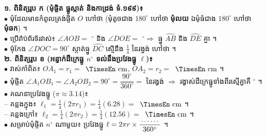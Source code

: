 \documentclass[a4paper,10pt]{article}
\newcommand{\en}[1]{{\TimesEn #1}}
\newcommand{\unit}[1]{\,\text{\en{#1}}}
\newcommand{\ang}[1]{\ensuremath{\angle #1}}
\newcommand{\arc}[1]{\ensuremath{\widehat{#1}}}
\newcommand{\dotline}[1]{\makebox[#1]{\dotfill}}
\begin{document}
\begin{tcolorbox}[enhanced, sharp corners, colback=white, colframe=black, boxrule=0.85pt, top=4pt, bottom=4pt, left=6pt, right=6pt]
\begin{minipage}[c]{9.0cm}
  \end{minipage}\hfill
  \begin{minipage}[c]{9.2cm}
    \textbf{១. ពិនិត្យរូប ក (មុំផ្ចិត ធ្នូស្កាត់ និងកាដ្រង់ ទំ.១៩៩)៖}\\[1.5pt]
    $\bullet$ មុំដែលមានកំពូលត្រង់ផ្ចិត $O$ ហៅថា \dotline{1.9cm} (មុំតូចជាង $180^\circ$ ហៅថា \textbf{មុំលយ} ឯមុំធំជាង $180^\circ$ ហៅថា \textbf{មុំឆក}) ។\\[1.5pt]
    $\bullet$ ប្រើរ៉ាប់ព័រទ័រវាស់៖ $\ang{AOB} =$ \dotline{1.0cm}$^\circ$ និង $\ang{DOE} =$ \dotline{1.0cm}$^\circ \Rightarrow$ ធ្នូ $\arc{AB}$ និង $\arc{DE}$ \dotline{1.7cm} គ្នា ។\\[1.5pt]
    $\bullet$ មុំកែង $\ang{DOC} = 90^\circ$ ស្កាត់ធ្នូ $\arc{DC}$ ស្មើនឹង $\frac{1}{4}$ នៃរង្វង់ ហៅថា \dotline{2.0cm} ។\\[3pt]
    \textbf{២. ពិនិត្យរូប ខ (អន្ទាក់ដឺក្រេធ្នូ $n^\circ$ ទល់នឹងប្រវែងធ្នូ $\ell$)៖}\\[1.5pt]
    $\bullet$ វាស់កាំពិត៖ $OA_1 = r_1 =$ \dotline{0.9cm}$\unit{cm}$, $OA_2 = r_2 =$ \dotline{0.9cm}$\unit{cm}$ ។\\[1.5pt]
    $\bullet$ មុំផ្ចិត $\ang{A_1OB_1} = \ang{A_2OB_2} = 90^\circ = \dfrac{90^\circ}{360^\circ} =$ \dotline{0.9cm} នៃរង្វង់ $\Rightarrow$ រង្វាស់ដឺក្រេធ្នូទាំងពីរស្មើគ្នាគឺ \dotline{1.1cm}$^\circ$ ។\\[1.5pt]
    $\bullet$ គណនាប្រវែងធ្នូ ($\pi \approx 3.14$)៖\\
    \hspace*{0.3cm}-- គន្លងក្នុង៖ $\ell_1 = \frac{1}{4}(2\pi r_1) = \frac{1}{4}(6.28) =$ \dotline{1.2cm}$\unit{cm}$ ។\\
    \hspace*{0.3cm}-- គន្លងក្រៅ៖ $\ell_2 = \frac{1}{4}(2\pi r_2) = \frac{1}{4}(12.56) =$ \dotline{1.2cm}$\unit{cm}$ ។\\[1.5pt]
    $\bullet$ សម្រាប់មុំផ្ចិត $n^\circ$ ណាមួយ៖ ប្រវែងធ្នូ $\ell = 2\pi r \times \dfrac{\dotline{1.0cm}}{360^\circ}$ ។
  \end{minipage}
\end{tcolorbox}
\end{document}
